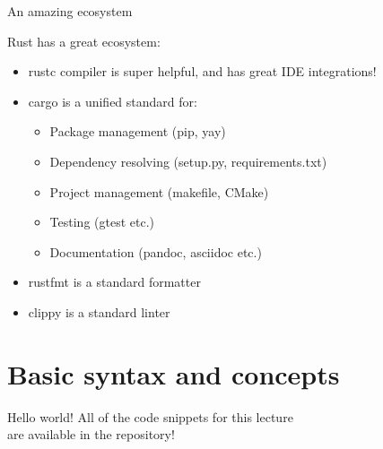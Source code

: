 \documentclass[usenames,dvipsnames,10pt,aspectratio=169]{beamer}
\begin{document}
\begin{frame}{An amazing ecosystem} 
\vspace{0.25cm}

\large
Rust has a great ecosystem:
\begin{itemize}[label=$\bullet$]
	\item \textcolor{ucuyellow}{rustc} compiler is super helpful, and has great IDE integrations!
	\item \textcolor{ucuyellow}{cargo} is a unified standard for:
		\begin{itemize}[label=$\bullet$]
			\item Package management (pip, yay)
			\item Dependency resolving (setup.py, requirements.txt)
			\item Project management (makefile, CMake)
			\item Testing (gtest etc.)
			\item Documentation (pandoc, asciidoc etc.)
		\end{itemize}
	\item \textcolor{ucuyellow}{rustfmt} is a standard formatter
	\item \textcolor{ucuyellow}{clippy} is a standard linter
\end{itemize}
\vspace{0.55cm}
\end{frame}


\section{Basic syntax and concepts}

\begin{frame}{Hello world!}
	\large
	\textcolor{ucuyellow}{
	All of the code snippets for this lecture\\
	are available in the repository!}
	\vspace{0.5cm}
	\inputminted[fontsize=\Large]{c}{code/helloworld.rs}
	\vspace{0.4cm}
	\inputminted[fontsize=\Large]{bash}{code/helloworld.sh}

\end{frame}
\end{document}
